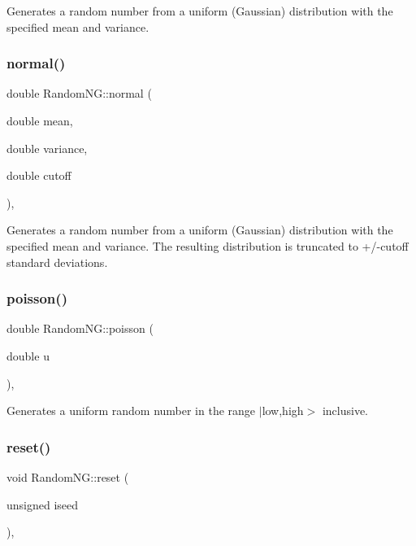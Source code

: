 Generates a random number from a uniform (Gaussian) distribution with the specified mean and variance. \mbox{\label{classRandomNG_a97273e66717ff62b3ed07d6f7b98e05a}} 
\subsubsection{\texorpdfstring{normal()}{normal()}\hspace{0.1cm}{\footnotesize\ttfamily [2/2]}}
{\footnotesize\ttfamily double Random\+N\+G\+::normal (\begin{DoxyParamCaption}\item[{double}]{mean,  }\item[{double}]{variance,  }\item[{double}]{cutoff }\end{DoxyParamCaption})\hspace{0.3cm}{\ttfamily [inline]}, {\ttfamily [static]}}

Generates a random number from a uniform (Gaussian) distribution with the specified mean and variance. The resulting distribution is truncated to +/-\/cutoff standard deviations. \mbox{\label{classRandomNG_a8a27bb986aca792cb4ca652125cd9676}} 
\subsubsection{\texorpdfstring{poisson()}{poisson()}}
{\footnotesize\ttfamily double Random\+N\+G\+::poisson (\begin{DoxyParamCaption}\item[{double}]{u }\end{DoxyParamCaption})\hspace{0.3cm}{\ttfamily [inline]}, {\ttfamily [static]}}

Generates a uniform random number in the range $\vert$low,high$>$ inclusive. \mbox{\label{classRandomNG_a20d6021c831b68ac579b5d812bbbad9d}} 
\subsubsection{\texorpdfstring{reset()}{reset()}}
{\footnotesize\ttfamily void Random\+N\+G\+::reset (\begin{DoxyParamCaption}\item[{unsigned}]{iseed }\end{DoxyParamCaption})\hspace{0.3cm}{\ttfamily [inline]}, {\ttfamily [static]}}

